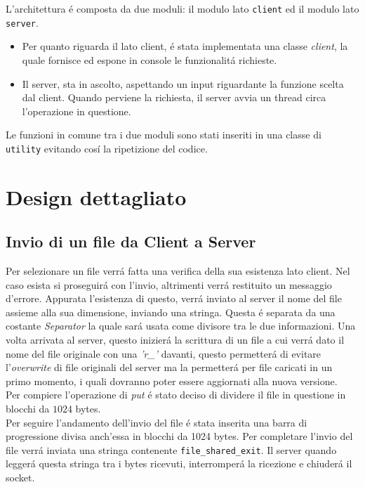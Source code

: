 \documentclass[a4paper, 12pt]{report}
\begin{document}
L'architettura é composta da due moduli: il modulo lato \texttt{client} ed il modulo lato \texttt{server}.
\begin{itemize}
    \item Per quanto riguarda il lato client, é stata implementata una classe \emph{client}, la quale fornisce ed espone
    in console le funzionalitá richieste.
    \item Il server, sta in ascolto, aspettando un input riguardante la funzione scelta dal client.
    Quando perviene la richiesta, il server avvia un thread circa l'operazione in questione.
\end{itemize}
Le funzioni in comune tra i due moduli sono stati inseriti in una classe di \texttt{utility} evitando cosí la ripetizione del codice.

\section{Design dettagliato}
\subsection{Invio di un file da Client a Server} \label{clientToServer}
Per selezionare un file verrá fatta una verifica della sua esistenza lato client. Nel caso esista si proseguirá
con l'invio, altrimenti verrá restituito un messaggio d'errore. Appurata l'esistenza di questo, verrá inviato
al server il nome del file assieme alla sua dimensione, inviando una stringa. Questa é separata da una costante \emph{Separator}
la quale sará usata come divisore tra le due informazioni. Una volta arrivata al server, questo inizierá la scrittura
di un file a cui verrá dato il nome del file originale con una \emph{'r\_'} davanti, questo permetterá di evitare l'\emph{overwrite} di file
originali del server ma la permetterá per file caricati in un primo momento, i quali dovranno poter essere aggiornati alla nuova versione.
\\
Per compiere l'operazione di \emph{put} é stato deciso di dividere il file in questione in blocchi da \(1024\) bytes.
\\
Per seguire l'andamento dell'invio del file é stata inserita una barra di progressione divisa anch'essa in blocchi da 1024 bytes.
Per completare l'invio del file verrá inviata una stringa contenente \texttt{file\_shared\_exit}.
Il server quando leggerá questa stringa tra i bytes ricevuti, interromperá la ricezione e chiuderá il socket.
\end{document}
